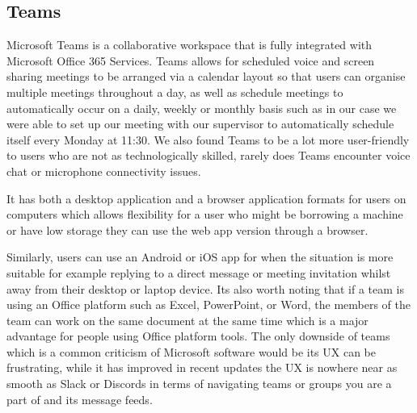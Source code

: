 \subsection{Teams}
Microsoft Teams is a collaborative workspace that is fully integrated with Microsoft Office 365 Services. Teams allows for scheduled voice and screen sharing meetings to be arranged via a calendar layout so that users can organise multiple meetings throughout a day, as well as schedule meetings to automatically occur on a daily, weekly or monthly basis such as in our case we were able to set up our meeting with our supervisor to automatically schedule itself every Monday at 11:30. 
\newline \newline 
We also found Teams to be a lot more user-friendly to users who are not as technologically skilled, rarely does Teams encounter voice chat or microphone connectivity issues. 

It has both a desktop application and a browser application formats for users on computers which allows flexibility for a user who might be borrowing a machine or have low storage they can use the web app version through a browser.
\newline

Similarly, users can use an Android or iOS app for when the situation is more suitable for example replying to a direct message or meeting invitation whilst away from their desktop or laptop device. Its also worth noting that if a team is using an Office platform such as Excel, PowerPoint, or Word, the members of the team can work on the same document at the same time which is a major advantage for people using Office platform tools. The only downside of teams which is a common criticism of Microsoft software would be its UX can be frustrating, while it has improved in recent updates the UX is nowhere near as smooth as Slack or Discords in terms of navigating teams or groups you are a part of and its message feeds.
\newpage
